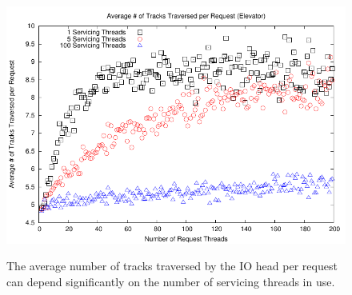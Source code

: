 \documentclass{report}
\begin{document}
\newpage
\begin{figure}[htb!]
    \centering
    \includegraphics[scale=1]{distanceElevator.pdf}
    \label{fig:distanceElevator}
    \caption{The average number of tracks traversed by the IO head per request can depend
    significantly on the number of servicing threads in use.}
\end{figure}
\end{document}
